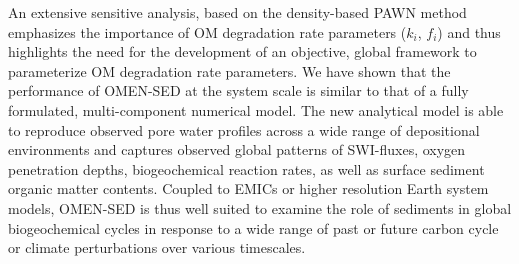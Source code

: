 \documentclass[gmd, manuscript]{copernicus}
\begin{document}
An extensive sensitive analysis, based on the density-based PAWN method \citep{pianosi_simple_2015} emphasizes the importance of OM degradation rate parameters ($k_i$, $f_i$) and thus highlights the need for the development of 
an objective, global framework to parameterize OM degradation rate parameters. We have shown that the performance of OMEN-SED at the system scale is similar to that of a fully formulated, multi-component numerical model. The new analytical model 
is able to reproduce observed pore water profiles across a wide range of depositional environments and captures observed global patterns of SWI-fluxes, oxygen penetration depths, biogeochemical reaction rates, as well as surface 
sediment organic matter contents. Coupled to EMICs or higher resolution Earth system models, OMEN-SED is thus well suited to examine the role of sediments in global biogeochemical cycles in response to a wide range of past 
or future carbon cycle or climate perturbations over various timescales. 



\end{document}
